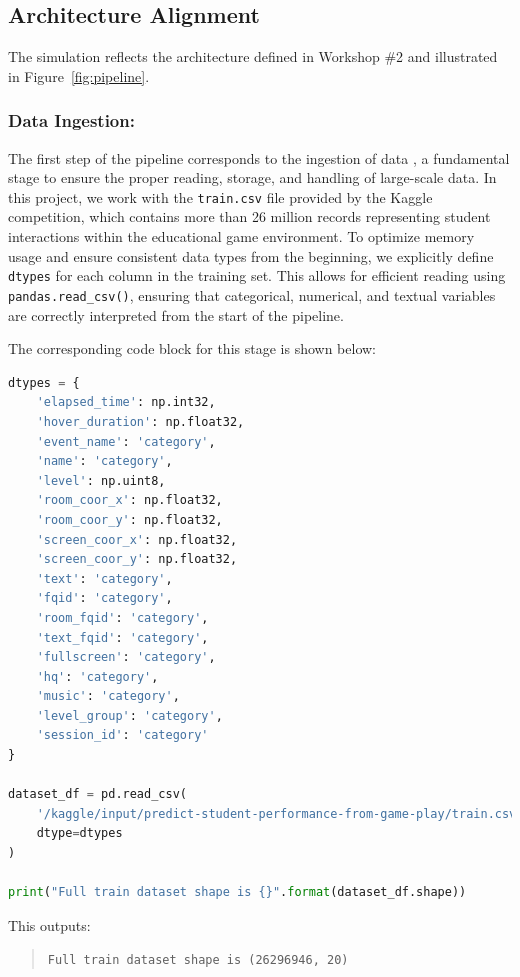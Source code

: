 \documentclass[12pt]{article}
\begin{document}
	\subsection{Architecture Alignment}
	The simulation reflects the architecture defined in Workshop \#2 and illustrated in Figure~\ref{fig:pipeline}.
	
	\subsubsection{Data Ingestion:}
    The first step of the pipeline corresponds to the ingestion of data \textbf{}, a fundamental stage to ensure the proper reading, storage, and handling of large-scale data. In this project, we work with the \texttt{train.csv} file provided by the Kaggle competition, which contains more than 26 million records representing student interactions within the educational game environment.
To optimize memory usage and ensure consistent data types from the beginning, we explicitly define \texttt{ dtypes} for each column in the training set. This allows for efficient reading using \texttt{pandas.read\_csv()}, ensuring that categorical, numerical, and textual variables are correctly interpreted from the start of the pipeline.

The corresponding code block for this stage is shown below:

\begin{lstlisting}[language=Python, caption=Explicit Data Typing and Ingestion, basicstyle=\ttfamily\small]
dtypes = {
    'elapsed_time': np.int32,
    'hover_duration': np.float32,
    'event_name': 'category',
    'name': 'category',
    'level': np.uint8,
    'room_coor_x': np.float32,
    'room_coor_y': np.float32,
    'screen_coor_x': np.float32,
    'screen_coor_y': np.float32,
    'text': 'category',
    'fqid': 'category',
    'room_fqid': 'category',
    'text_fqid': 'category',
    'fullscreen': 'category',
    'hq': 'category',
    'music': 'category',
    'level_group': 'category',
    'session_id': 'category'
}

dataset_df = pd.read_csv(
    '/kaggle/input/predict-student-performance-from-game-play/train.csv',
    dtype=dtypes
)

print("Full train dataset shape is {}".format(dataset_df.shape))
\end{lstlisting}

This outputs:

\begin{quote}
\texttt{Full train dataset shape is (26296946, 20)}
\end{quote}
\end{document}
